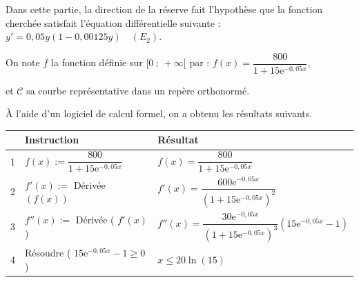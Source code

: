 \documentclass[10pt]{article}
\providecommand{\e}{{\mathrm{e}}}
\begin{document}
	Dans cette partie, la direction de la réserve fait l'hypothèse que la fonction cherchée satisfait l'équation différentielle suivante :
$y'=0,05 y \left (1-0,00125 y\right ) \quad (E_2)$.

On note $f$ la fonction définie sur $[0 ~;~ +\infty[$ par :
$f(x)=\dfrac{800}{1+15 \e^{-0,05 x}}$,

	et $\mathcal{C}$ sa courbe représentative dans un repère orthonormé.

	\medskip

	À l'aide d'un logiciel de calcul formel, on a obtenu les résultats suivants.



	\begin{center}
\renewcommand{\arraystretch}{1.5}
\begin{tabularx}{\linewidth}{|l|l|>{\centering \arraybackslash}X|} 
\hline
  & Instruction & Résultat \\	
\hline
1 & $f(x):=\dfrac{800}{1+15 \e^{-0,05 x}}$	& $f(x)=\dfrac{800}{1+15 \e^{-0,05 x}}$  \rule[-13pt]{0pt}{30pt}\\	
\hline
2 & $f'(x):=$ Dérivée $(f(x))$ & $f'(x)=\dfrac{600 \e^{-0,05 x}}{\left(1+15 \e^{-0,05 x}\right)^{2}}$ \rule[-15pt]{0pt}{35pt} \\ 
\hline
3 & $f''(x):=$ Dérivée ( $f'(x)$ ) & $f''(x)=\dfrac{30 \e^{-0,05 x}}{\left(1+15 \e^{-0,05 x}\right)^{3}}\left(15 \e^{-0,05 x}-1\right)$ \rule[-15pt]{0pt}{35pt} \\ 
\hline
4 & Résoudre ( $15 \e^{-0,05 x}-1 \geqslant 0$ )  & $x \leqslant 20 \ln (15)$  \\		
\hline
\end{tabularx}
\renewcommand{\arraystretch}{1}
	\end{center}
\end{document}
